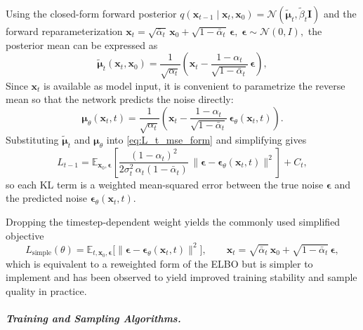 Using the closed-form forward posterior
\(
q(\mathbf{x}_{t-1}\mid\mathbf{x}_t,\mathbf{x}_0)
=
\mathcal{N}(\tilde{\boldsymbol{\mu}}_t,\tilde{\beta}_t\mathbf{I})
\)
and the forward reparameterization
\(
\mathbf{x}_t = \sqrt{\bar{\alpha}_t}\,\mathbf{x}_0 +
\sqrt{1-\bar{\alpha}_t}\,\boldsymbol{\epsilon},\;
\boldsymbol{\epsilon}\sim\mathcal{N}(0,I),
\)
the posterior mean can be expressed as
\begin{equation}
\tilde{\boldsymbol{\mu}}_t(\mathbf{x}_t,\mathbf{x}_0)
=
\frac{1}{\sqrt{\alpha_t}}
\left(
\mathbf{x}_t
-
\frac{1-\alpha_t}{\sqrt{1-\bar{\alpha}_t}}\,
\boldsymbol{\epsilon}
\right),
\end{equation}
Since $\mathbf{x}_t$ is available as model
input, it is convenient to parametrize the reverse mean so that the network predicts the noise
directly:
\begin{equation}
\boldsymbol{\mu}_\theta(\mathbf{x}_t,t)
=
\frac{1}{\sqrt{\alpha_t}}
\left(
\mathbf{x}_t
-
\frac{1-\alpha_t}{\sqrt{1-\bar{\alpha}_t}}\,
\boldsymbol{\epsilon}_\theta(\mathbf{x}_t,t)
\right).
\label{eq:reverse_mean_eps_param}
\end{equation}
Substituting $\tilde{\boldsymbol{\mu}}_t$ and $\boldsymbol{\mu}_\theta$ into
\eqref{eq:L_t_mse_form} and simplifying gives
\begin{equation}
L_{t-1}
=
\mathbb{E}_{\mathbf{x}_0,\boldsymbol{\epsilon}}
\left[
\frac{(1-\alpha_t)^2}{2\sigma_t^2\,\alpha_t(1-\bar{\alpha}_t)}
\,
\bigl\|
\boldsymbol{\epsilon}
-
\boldsymbol{\epsilon}_\theta(\mathbf{x}_t,t)
\bigr\|^2
\right]
+ C_t,
\end{equation}
so each KL term is a weighted mean-squared error between the true noise
$\boldsymbol{\epsilon}$ and the predicted noise $\boldsymbol{\epsilon}_\theta(\mathbf{x}_t,t)$.

Dropping the timestep-dependent weight yields the commonly used simplified objective
\begin{equation}
L_{\mathrm{simple}}(\theta)
=
\mathbb{E}_{t,\mathbf{x}_0,\boldsymbol{\epsilon}}
\bigl[
\|
\boldsymbol{\epsilon}
-
\boldsymbol{\epsilon}_\theta(\mathbf{x}_t,t)
\|^2
\bigr],
\qquad
\mathbf{x}_t
=
\sqrt{\bar{\alpha}_t}\,\mathbf{x}_0
+
\sqrt{1-\bar{\alpha}_t}\,\boldsymbol{\epsilon},
\label{eq:ddpm_simple_loss}
\end{equation}
which is equivalent to a reweighted form of the ELBO but is simpler to implement and has been
observed to yield improved training stability and sample quality in practice.


\subparagraph{Training and Sampling Algorithms.}

